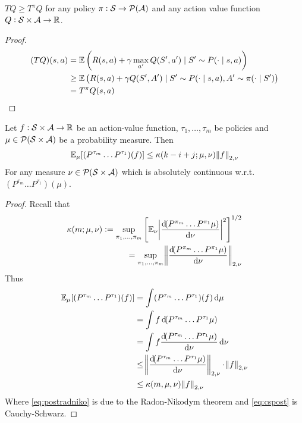 
\begin{lem}\label{lem:tlemma}
  $T Q \geq T^\pi Q$ for any policy $\pi : \mathcal{S} \to \mathcal{P}(\mathcal{A})$
  and any action value function $Q: \mathcal{S} \times \mathcal{A} \to \mathbb{R}$.
\end{lem}
\begin{proof}
  \begin{align*}
    (TQ)(s, a) &= \mathbb{E} \left( R(s, a) + \gamma \max_{a'} Q(S', a')
    \mid S' \sim P(\cdot \mid s, a) \right)
    \\ &\geq \mathbb{E} \left( R(s, a) + \gamma Q(S', A')
    \mid S' \sim P(\cdot \mid s, a), A' \sim \pi(\cdot \mid S') \right)
    \\ &= T^\pi Q(s,a)
  \end{align*}
\end{proof}

\begin{lem}\label{lem:MRN}
  Let $f:\mathcal{S}\times\mathcal{A} \to \mathbb{R}$ be an action-value function,
  $\tau_1, \dots, \tau_m$ be policies
  and $\mu \in \mathcal{P}(\mathcal{S}\times\mathcal{A})$ be a probability measure.
  Then
  \begin{align*}
    \mathbb{E}_\mu [(P^{\tau_m} \dots P^{\tau_1})(f)]
    \leq \kappa(k - i + j; \mu, \nu) \norm{f}_{2,\nu}
  \end{align*}
  For any measure $\nu \in \mathcal{P}(\mathcal{S}\times\mathcal{A})$ which is
  absolutely continuous w.r.t. $(P^{\tau_m} \dots P^{\tau_1})(\mu)$.
\end{lem}
\begin{proof}
  Recall that
  \begin{align*}
    \kappa(m; \mu, \nu) := \sup_{\pi_1, \dots, \pi_m} \left[
      \E_{\nu} \abs{\frac{\dif (P^{\pi_m}\dots P^{\pi_1}\mu)}{\dif \nu}}^2
      \right]^{1/2}
      \\ = \sup_{\pi_1, \dots, \pi_m}
      \norm{\frac{\dif (P^{\pi_m}\dots P^{\pi_1}\mu)}{\dif \nu}}_{2, \nu}
  \end{align*}
  Thus
  \begin{align}
    \E_\mu [(P^{\tau_m} \dots P^{\tau_1})(f)]
    &= \int (P^{\tau_m} \dots P^{\tau_1})(f) \dif \mu
    \\ &= \int f \dif (P^{\tau_m} \dots P^{\tau_1} \mu)
    \label{eq:preradniko}
    \\ &= \int f \frac{\dif(P^{\tau_m} \dots P^{\tau_1} \mu)}{\dif \nu} \dif \nu
    \label{eq:postradniko}
    \\ &\leq \norm{\frac{\dif(P^{\tau_m} \dots P^{\tau_1} \mu)}{\dif \nu}}_{2,\nu}
    \cdot \norm{f}_{2, \nu} \label{eq:cspost}
    \\ &\leq \kappa(m, \mu, \nu) \norm{f}_{2,\nu}
  \end{align}
  Where \cref{eq:postradniko} is due to the Radon-Nikodym theorem
  and \cref{eq:cspost} is Cauchy-Schwarz.
\end{proof}

